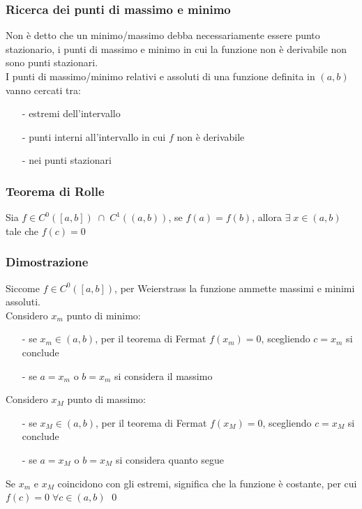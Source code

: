 \documentclass[a4paper]{article}
\newcommand\cont[2]{C^{#1} \left({#2}\right)}
\begin{document}
\subsubsection*{Ricerca dei punti di massimo e minimo}
Non è detto che un minimo/massimo debba necessariamente essere punto stazionario, i punti di massimo e minimo in cui la funzione non è derivabile
non sono punti stazionari. \\
I punti di massimo/minimo relativi e assoluti di una funzione definita in \(\left(a, b\right)\) vanno cercati tra:
\begin{itemize} [topsep=3pt, itemsep=0pt]
	\item[-] estremi dell'intervallo
	\item[-] punti interni all'intervallo in cui \(f\) non è derivabile
	\item[-] nei punti stazionari
\end{itemize}

\subsubsection*{Teorema di Rolle}
Sia \(f \in \cont{0}{\left[a, b\right]} \; \cap \; \cont{1}{\left(a, b\right)}\), se \(f(a) = f(b)\), allora \(\exists \; x \in \left(a, b\right)\)
tale che \(f(c) = 0\)

\subsubsection*{Dimostrazione}
Siccome \(f \in \cont{0}{\left[a, b\right]}\), per Weierstrass la funzione ammette massimi e minimi assoluti. \\
Considero \(x_m\) punto di minimo:
\begin{itemize} [topsep=3pt, itemsep=0pt]
	\item[-] se \(x_m \in \left(a, b\right)\), per il teorema di Fermat \(f(x_m) = 0\), scegliendo \(c = x_m\) si conclude
	\item[-] se \(a = x_m\) o \(b = x_m\) si considera il massimo
\end{itemize}
Considero \(x_M\) punto di massimo:
\begin{itemize} [topsep=3pt, itemsep=0pt]
	\item[-] se \(x_M \in \left(a, b\right)\), per il teorema di Fermat \(f(x_M) = 0\), scegliendo \(c = x_M\) si conclude
	\item[-] se \(a = x_M\) o \(b = x_M\) si considera quanto segue
\end{itemize}
Se \(x_m\) e \(x_M\) coincidono con gli estremi, significa che la funzione è costante, per cui \(f(c) = 0 \; \forall c \in \left(a, b\right)\)
\qed
\end{document}
